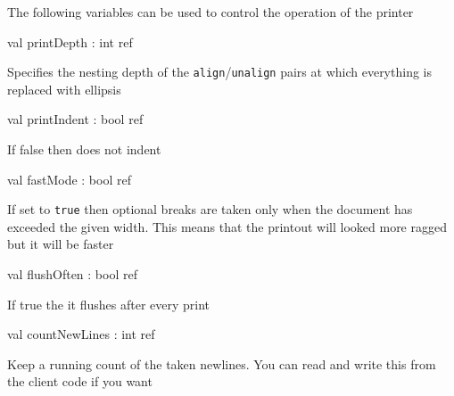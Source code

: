 \documentclass[11pt]{article}
\begin{document}
The following variables can be used to control the operation of the printer



\label{val:Pretty.printDepth}\begin{ocamldoccode}
val printDepth : int ref
\end{ocamldoccode}
\begin{ocamldocdescription}
Specifies the nesting depth of the {\tt{align}}/{\tt{unalign}} pairs at which 
    everything is replaced with ellipsis


\end{ocamldocdescription}




\label{val:Pretty.printIndent}\begin{ocamldoccode}
val printIndent : bool ref
\end{ocamldoccode}
\begin{ocamldocdescription}
If false then does not indent


\end{ocamldocdescription}




\label{val:Pretty.fastMode}\begin{ocamldoccode}
val fastMode : bool ref
\end{ocamldoccode}
\begin{ocamldocdescription}
If set to {\tt{true}} then optional breaks are taken only when the document 
    has exceeded the given width. This means that the printout will looked 
    more ragged but it will be faster


\end{ocamldocdescription}




\label{val:Pretty.flushOften}\begin{ocamldoccode}
val flushOften : bool ref
\end{ocamldoccode}
\begin{ocamldocdescription}
If true the it flushes after every print


\end{ocamldocdescription}




\label{val:Pretty.countNewLines}\begin{ocamldoccode}
val countNewLines : int ref
\end{ocamldoccode}
\begin{ocamldocdescription}
Keep a running count of the taken newlines. You can read and write this 
 from the client code if you want


\end{ocamldocdescription}
\end{document}
